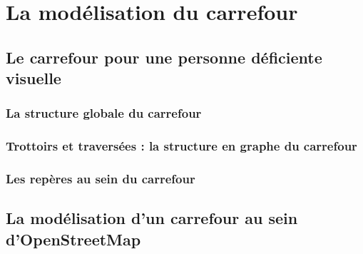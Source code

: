 \chapter{La modélisation du carrefour}


\todo{}

\section{Le carrefour pour une personne déficiente visuelle}


\todo{}

\subsection{La structure globale du carrefour}


\todo{}

\subsection{Trottoirs et traversées : la structure en graphe du carrefour}


\todo{}

\subsection{Les repères au sein du carrefour}


\section{La modélisation d’un carrefour au sein d’OpenStreetMap}


\todo{}

